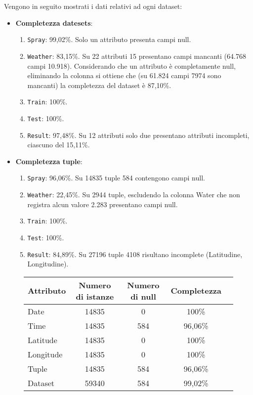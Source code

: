 Vengono in seguito mostrati i dati relativi ad ogni dataset:
\begin{itemize}
	\item \textbf{Completezza datesets}:
		\begin{enumerate}
			\item \texttt{Spray}: 99,02\%. Solo un attributo presenta campi null.
			\item \texttt{Weather}: 83,15\%. Su 22 attributi 15 presentano campi mancanti (64.768 campi 10.918). Considerando che un attributo è completamente null, eliminando la colonna si ottiene che (su 61.824 campi 7974 sono mancanti) la completezza del dataset è 87,10\%.
			\item \texttt{Train}: 100\%.
			\item \texttt{Test}: 100\%.
			\item \texttt{Result}: 97,48\%. Su 12 attributi solo due presentano attributi incompleti, ciascuno del 15,11\%.
		\end{enumerate}
	
	\item \textbf{Completezza tuple}:
		\begin{enumerate}
			\item \texttt{Spray}: 96,06\%. Su 14835 tuple 584 contengono campi null.
			\item \texttt{Weather}: 22,45\%. Su 2944 tuple, escludendo la colonna Water che non registra alcun valore 2.283 presentano campi null.
			\item \texttt{Train}: 100\%.
			\item \texttt{Test}: 100\%.
			\item \texttt{Result}: 84,89\%. Su 27196 tuple 4108 risultano incomplete (Latitudine, Longitudine).
		\end{enumerate}
\end{itemize}

\begin{figure}[H]
	\centering
	\begin{tabular}{lcccc}
		\toprule
		\textbf{Attributo} \quad & \textbf{Numero di istanze} & \textbf{Numero di null} & \textbf{Completezza} \\
		\midrule
		Date &               14835  & 0                      & 100\%      \\ 
		Time 	&               14835  & 584                      & 96,06\%      \\ 
		Latitude &              14835  & 0                      & 100\%      \\ 
		Longitude &             14835  & 0                      & 100\%      \\ 
		\midrule
		Tuple 		&				14835  &	584			   & 96,06\%\\
		Dataset  	&	   59340  &	584 		   & 99,02\%\\
		\bottomrule
	\end{tabular}
	\label{tab:completezza spray}
\end{figure}

